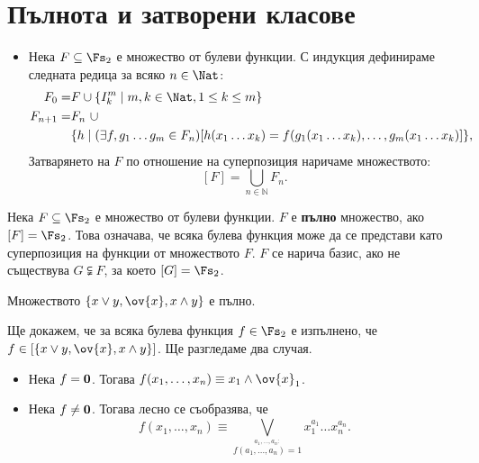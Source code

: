 \section{Пълнота и затворени класове}

\begin{itemize}
\item 
  Нека $F\subseteq \Fs_2$ е множество от булеви функции.
  С индукция дефинираме следната редица за всяко $n \in \Nat$:
  \begin{align*}
    F_0 = & F\cup \{I^m_k \mid m,k\in\Nat, 1\leq k\leq m\}\\
    F_{n+1} = & F_n\ \cup\\
    & \{h \mid (\exists f, g_1\dots g_m \in F_n)[h(x_1\dots x_k) =  f(g_1(x_1\dots x_k), \dots, g_m(x_1\dots x_k)]\},
  \end{align*}
  Затварянето на $F$ по отношение на суперпозиция наричаме множеството:
  \[[F] = \bigcup_{n\in \mathbb{N}}F_n.\]
\end{itemize}



\begin{dfn}
  Нека $F\subseteq \Fs_2$ е множество от булеви функции. 
  $F$ е {\bf пълно} множество, ако $[F] = \Fs_2$.
  Това означава, че всяка булева функция може да се представи като суперпозиция на функции от множеството $F$.
  $F$ се нарича базис, ако не съществува $G \subsetneqq F$, за което $[G] = \Fs_2$.
\end{dfn}

\begin{thm}[Бул]
  Множеството $\{x\vee y,\ov{x},x\wedge y\}$ е пълно.
\end{thm}
\begin{hint}
  Ще докажем, че за всяка булева функция $f \in \Fs_2$ е изпълнено, че
  $f \in [\{x\vee y, \ov{x}, x \wedge y\}]$.
  Ще разгледаме два случая.
  \begin{itemize}
  \item 
    Нека $f = \bf{0}$. Тогава $f(x_1,\dots,x_n) \equiv x_1\wedge\ov{x}_1$.
  \item
    Нека $f \neq \bf{0}$. Тогава лесно се съобразява, че
    \[f(x_1,\dots,x_n) \equiv \bigvee_{\stackrel{a_1,\dots,a_n:}{f(a_1,\dots,a_n) = 1}} x^{a_1}_1\dots x^{a_n}_n.\]
  \end{itemize}
\end{hint}

